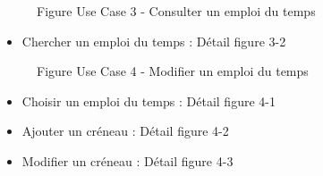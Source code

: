 \documentclass[a4paper, 11pt]{article}
\begin{document}
        \begin{figure}[h]
        \caption{Figure Use Case 3 - Consulter un emploi du temps}
        \label{fig-diag-use-case-3}
        \end{figure}
        \begin{itemize}
        \item Chercher un emploi du temps : Détail figure 3-2
        \end{itemize}
	\begin{figure}[h]
        \caption{Figure Use Case 4 - Modifier un emploi du temps}
        \label{fig-diag-use-case-4}
        \end{figure}
        \begin{itemize}
        \item Choisir un emploi du temps : Détail figure 4-1
        \item Ajouter un créneau : Détail figure 4-2
        \item Modifier un créneau : Détail figure 4-3
        \end{itemize}
        \clearpage
\end{document}
